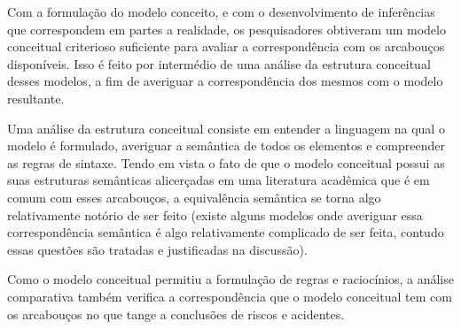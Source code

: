 Com a formulação do modelo conceito, e com o desenvolvimento de inferências que correspondem em partes a realidade, os pesquisadores obtiveram um modelo conceitual criterioso suficiente para avaliar a correspondência com os arcabouços disponíveis. Isso é feito por intermédio de uma análise da estrutura conceitual desses modelos, a fim de averiguar a correspondência dos mesmos com o modelo resultante.

Uma análise da estrutura conceitual consiste em entender a linguagem na qual o modelo é formulado, averiguar a semântica de todos os elementos e compreender as regras de sintaxe. Tendo em vista o fato de que o modelo conceitual possui as suas estruturas semânticas alicerçadas em uma literatura acadêmica que é em comum com esses arcabouços, a equivalência semântica se torna algo relativamente notório de ser feito (existe alguns modelos onde averiguar essa correspondência semântica é algo relativamente complicado de ser feita, contudo essas questões são tratadas e justificadas na discussão).

Como o modelo conceitual permitiu a formulação de regras e raciocínios, a análise comparativa também verifica a correspondência que o modelo conceitual tem com os arcabouços no que tange a conclusões de riscos e acidentes.